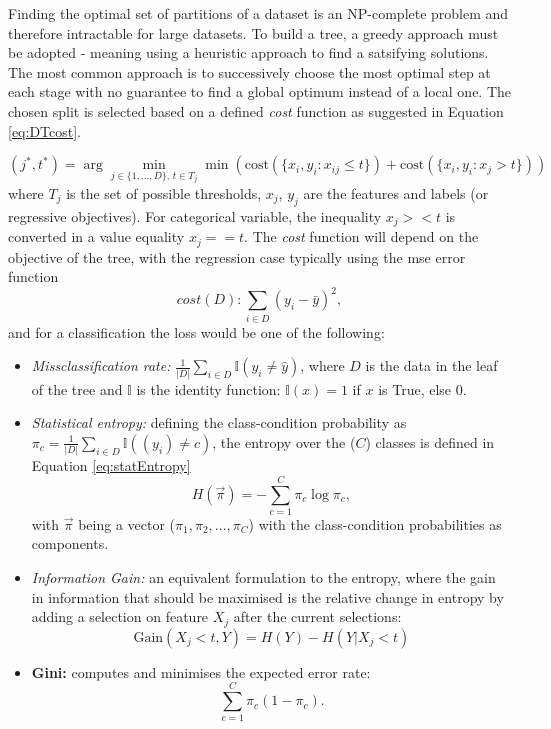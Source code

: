 Finding the optimal set of partitions of a dataset is an NP-complete problem and therefore intractable for large datasets. To build a tree, a greedy approach must be adopted - meaning using a heuristic approach to find a satsifying solutions. The most common approach is to successively choose the most optimal step at each stage with no guarantee to find a global optimum instead of a local one. The chosen split is selected based on a defined \textit{cost} function as suggested in Equation \ref{eq:DTcost}.

\begin{equation}\label{eq:DTcost}
    (j^*, t^*) = \arg\min_{j\in \{1, ..., D\},\, t \in T_j} \min \left(\text{cost} (\{x_i, y_i : x_{ij} \leq t\}) + \text{cost}(\{x_i, y_i : x_j > t\}) \right)
\end{equation}
where $T_j$ is the set of possible thresholds, $x_j$, $y_j$ are the features and labels (or regressive objectives). For categorical variable, the inequality $x_j >< t$ is converted in a value equality $x_j == t$. The \textit{cost} function will depend on the objective of the tree, with the regression case typically using the \gls{mse} error function \[cost(D) : \sum_{i\in D}(y_i - \bar{y})^2,\] and for a classification the loss would be one of the following:
\begin{itemize}
    \item \textit{Missclassification rate:} $\frac{1}{|D|} \sum_{i \in D} \mathbb{I}(y_i \neq \hat{y})$, where $D$ is the data in the leaf of the tree and $\mathbb{I}$ is the identity function: $\mathbb{I}(x) = 1$ if $x$ is True, else $0$. 
    \item \textit{Statistical entropy:} defining the class-condition probability as $\pi_c = \frac{1}{|D|} \sum_{i \in D} \mathbb{I}((y_i) \neq c)$, the entropy over the ($C$) classes is defined in Equation \ref{eq:statEntropy}
    \begin{equation}\label{eq:statEntropy}
        H(\vec{\pi}) = - \sum_{c=1}^C \pi_c \log \pi_c,
    \end{equation}
    with $\vec{\pi}$ being a vector ($\pi_1, \pi_2, ..., \pi_C$) with the class-condition probabilities as components.
    \item \textit{Information Gain:} an equivalent formulation to the entropy, where the gain in information that should be maximised is the relative change in entropy by adding a selection on feature $X_j$ after the current selections: 
    \[ \text{Gain}(X_j < t, Y) = H(Y) - H(Y | X_j < t) \]
    \item \textbf{Gini:} computes and minimises the expected error rate:
    \begin{equation}\label{eq:giniClass} 
        \sum_{c=1}^C \pi_c (1 - \pi_c).
    \end{equation}
\end{itemize}

